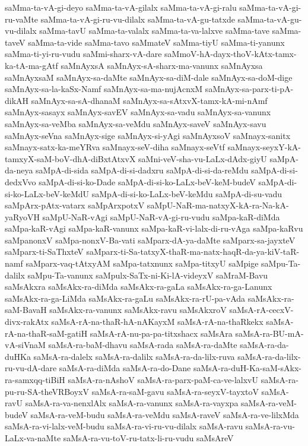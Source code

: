 {saMma-ta-vA-gi-deyo
saMma-ta-vA-gilalx
saMma-ta-vA-gi-ralu
saMma-ta-vA-gi-ru-vaMte
saMma-ta-vA-gi-ru-vu-dilalx
saMma-ta-vA-gu-tatxde
saMma-ta-vA-gu-vu-dilalx
saMma-tavU
saMma-ta-valalx
saMma-ta-va-lalxve
saMma-tave
saMma-taveV
saMma-ta-vide
saMma-tavo
saMmateV
saMma-tiyU
saMma-ti-yanunx
saMma-ti-yi-ru-vudu
saMmi-sharx-vA-dare
saMmoV-hA-dayx-thoV-kAtx-tamx-ka-tA-ma-gAtf
saMnAyxsA
saMnAyx-sA-sharx-ma-vanunx
saMnAyxsa
saMnAyxsaM
saMnAyx-sa-daMte
saMnAyx-sa-diM-dale
saMnAyx-sa-doM-dige
saMnAyx-sa-la-kaSx-Namf
saMnAyx-sa-ma-nujAcnxM
saMnAyx-sa-parx-ti-pA-dikAH
saMnAyx-sa-sA-dhanaM
saMnAyx-sa-sAtxvX-tamx-kA-mi-nAmf
saMnAyx-sasayx
saMnAyx-savEV
saMnAyx-sa-vadu
saMnAyx-sa-vanunx
saMnAyx-sa-veMba
saMnAyx-sa-veMdu
saMnAyx-saveV
saMnAyx-savu
saMnAyx-seVna
saMnAyx-sige
saMnAyx-si-yAgi
saMnAyxsoV
saMnayx-sanitx
saMnayx-satx-ka-meYRva
saMnayx-seV-diha
saMnayx-seVtf
saMnayx-seyxY-kA-tamxyX-saM-boV-dhA-diBxtAtxvX
saMni-veV-sha-vu-LaLx-dAdx-giyU
saMpA-da-neya
saMpA-di-sida
saMpA-di-si-dadxru
saMpA-di-si-da-reMdu
saMpA-di-si-dedxVvo
saMpA-di-si-ko-Dade
saMpA-di-si-ko-LaLx-beV-keM-budeV
saMpA-di-si-ko-LaLx-beV-keMdU
saMpA-di-si-ko-LaLx-beV-keMdu
saMpA-di-su-vadu
saMpArx-pAtx-vatarx
saMpArxpotxV
saMpU-NaR-ma-natxyX-kA-ra-Na-kA-yaRyoVH
saMpU-NaR-vAgi
saMpU-NaR-vA-gi-ru-vudu
saMpa-kaR-diMda
saMpa-kaR-vAgi
saMpa-kaR-vanunx
saMpa-kaR-vi-lalx-di-ru-vAga
saMpa-kaRvu
saMpanonxV
saMpa-nonxV-Ba-vati
saMparx-dA-ya-daMte
saMparx-sa-jayxteV
saMparx-ti-SaThxteV
saMparx-ti-Sa-tatxyX-thaR-ma-natx-haqR-da-ya-kiV-taR-namf
saMparx-vaq-tAtxyAM
saMpa-tatxnunx
saMpa-titxyU
saMpige
saMpu-Ta-dalilx
saMpu-Ta-vanunx
saMpulx-SaTx-ni-Ki-lA-videyxV
saMraM-Bavu
saMsAkxra
saMsAkx-ra-diMda
saMsAkx-ra-gaLa
saMsAkx-ra-ga-Lanunx
saMsAkx-ra-ga-LiMda
saMsAkx-ra-gaLu
saMsAkx-ra-rU-pa-vAda
saMsAkx-ra-saM-BavaH
saMsAkx-ra-vanunx
saMsAkx-ravu
saMsAkxroV
saMsA-rA-cecxV-divx-rakAtx
saMsA-rA-na-thaR-hA-nAKayxM
saMsA-rA-na-thaRkekx
saMsA-rA-na-thaR-saM-gatiH
saMsA-rA-nu-pa-pa-titxshacx
saMsAra
saMsA-ra-BU-mA-vA-siVnaM
saMsA-ra-baM-dhavu
saMsA-rada
saMsA-ra-daMte
saMsA-ra-da-duHKa
saMsA-ra-dalelx
saMsA-ra-dalilx
saMsA-ra-da-lilx-ruva
saMsA-ra-da-lilx-ru-vu-dA-dare
saMsA-ra-diMda
saMsA-ra-do-Dane
saMsA-ra-duH-Ka-saM-sAkx-ra-samxqq-tiBiH
saMsA-ra-nAshoV
saMsA-ra-parx-paM-ca-ve-lalxvU
saMsA-ra-pu-ru-SA-theVRBoyxV
saMsA-ra-saM-gavu
saMsA-ra-seyxV-tayxtoV
saMsA-ravU
saMsA-ra-va-nenxlAlx
saMsA-ra-vanunx
saMsA-ra-vayxpa
saMsA-ra-veM-budeV
saMsA-ra-veM-budu
saMsA-ra-veMdu
saMsA-raveV
saMsA-ra-ve-lilxMda
saMsA-ra-vi-lalx-veM-budu
saMsA-ra-vi-ru-vu-dilalx
saMsA-ravu
saMsA-ra-vu-LaLx-va-naMte
saMsA-ra-vu-toV-ru-tatx-li-ru-vudu
saMsAreV
}
